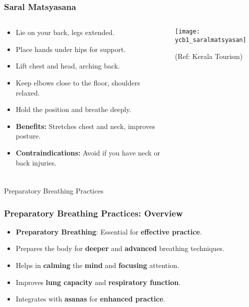 \begin{frame}[fragile]\frametitle{Saral Matsyasana}
\begin{columns}
    \begin{column}[T]{0.5\linewidth}
      \begin{itemize}
        \item Lie on your back, legs extended.
        \item Place hands under hips for support.
        \item Lift chest and head, arching back.
        \item Keep elbows close to the floor, shoulders relaxed.
        \item Hold the position and breathe deeply.
        \item \textbf{Benefits:} Stretches chest and neck, improves posture.
        \item \textbf{Contraindications:} Avoid if you have neck or back injuries.
      \end{itemize}
    \end{column}
    \begin{column}[T]{0.5\linewidth}
        \begin{center}
        \begin{center}
		        \texttt{[image: ycb1\_saralmatsyasan]}
				
				{\tiny (Ref: Kerala Tourism)}	        
		\end{center}   
        \end{center}    
    \end{column}
  \end{columns}
\end{frame}


\begin{frame}[fragile]\frametitle{}
\begin{center}
{\Large Preparatory Breathing Practices }
\end{center}
\end{frame}

\begin{frame}[fragile]\frametitle{Preparatory Breathing Practices: Overview}
      \begin{itemize}
        \item \textbf{Preparatory Breathing}: Essential for \textbf{effective practice}.
        \item Prepares the body for \textbf{deeper} and \textbf{advanced} breathing techniques.
        \item Helps in \textbf{calming} the \textbf{mind} and \textbf{focusing} attention.
        \item Improves \textbf{lung capacity} and \textbf{respiratory function}.
        \item Integrates with \textbf{asanas} for \textbf{enhanced practice}.
      \end{itemize}

\end{frame}

